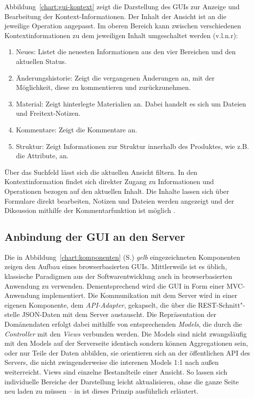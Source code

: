 Abbildung~\ref{chart:gui-kontext} zeigt die Darstellung des GUIs zur Anzeige und Bearbeitung der Kontext-Informationen. Der Inhalt der Ansicht ist an die jeweilige Operation angepasst. Im oberen Bereich kann zwischen verschiedenen Kontextinformationen zu dem jeweiligen Inhalt umgeschaltet werden  (v.l.n.r): 

\begin{enumerate}\itemsep -5pt
\item Neues: Listet die neuesten Informationen aus den vier Bereichen und den aktuellen Status.
\item Änderungshistorie: Zeigt die vergangenen Änderungen an, mit der Möglichkeit, diese zu kommentieren und zurückzunehmen.
\item Material: Zeigt hinterlegte Materialien an. Dabei handelt es sich um Dateien und Freitext-Notizen.
\item Kommentare: Zeigt die Kommentare an.
\item Struktur: Zeigt Informationen zur Struktur innerhalb des Produktes, wie z.B. die Attribute, an.
\end{enumerate}

Über das Suchfeld  lässt sich die aktuellen Ansicht filtern. In den Kontextinformation findet sich direkter Zugang zu Informationen und Operationen bezogen auf den aktuellen Inhalt. Die Inhalte lassen sich über Formulare  direkt bearbeiten, Notizen und Dateien werden angezeigt  und der Diksussion mithilfe der Kommentarfunktion ist möglich .

\subsection{Anbindung der GUI an den Server}\label{l:anbindung-gui}

Die in Abbildung~\ref{chart:komponenten} (S.\pageref{chart:komponenten}) \emph{gelb} eingezeichneten Komponenten zeigen den Aufbau eines browserbasierten GUIs. Mittlerweile ist es üblich, klassische Paradigmen aus der Softwarentwicklung auch in browserbasierten Anwendung zu verwenden. Dementsprechend wird die GUI in Form einer MVC-Anwendung implementiert. Die Kommunikation mit dem Server wird in einer eigenen Komponente, dem \emph{API-Adapter}, gekapselt, die über die REST-Schnitt"-stelle JSON-Daten mit dem Server austauscht. Die Repräsentation der Domänendaten erfolgt dabei mithilfe von entsprechenden \emph{Models}, die durch die \emph{Controller} mit den \emph{Views} verbunden werden. Die Models sind nicht zwangsläufig mit den Models auf der Serverseite identisch sondern können Aggregationen sein, oder nur Teile der Daten abbilden, sie orientieren sich an der öffentlichen API des Servers, die nicht zwingenderweise die interenen Models 1:1 nach außen weiterreicht. Views sind einzelne Bestandteile einer Ansicht. So lassen sich individuelle Bereiche der Darstellung leicht aktualisieren, ohne die ganze Seite neu laden zu müssen -- in \cite[S.1--5 und S.65--72]{maccaw2011javascript} ist dieses Prinzip ausführlich erläutert.

